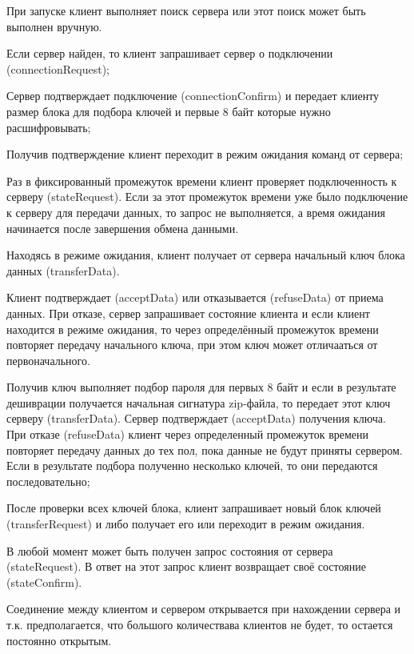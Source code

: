
\begin{DoxyEnumerate}
\item При запуске клиент выполняет поиск сервера или этот поиск может быть выполнен вручную.
\item Если сервер найден, то клиент запрашивает сервер о подключении (connection\+Request);
\item Сервер подтверждает подключение (connection\+Confirm) и передает клиенту размер блока для подбора ключей и первые 8 байт которые нужно расшифровывать;
\item Получив подтверждение клиент переходит в режим ожидания команд от сервера;
\item Раз в фиксированный промежуток времени клиент проверяет подключенность к серверу (state\+Request). Если за этот промежуток времени уже было подключение к серверу для передачи данных, то запрос не выполняется, а время ожидания начинается после завершения обмена данными.
\item Находясь в режиме ожидания, клиент получает от сервера начальный ключ блока данных (transfer\+Data).
\item Клиент подтверждает (accept\+Data) или отказывается (refuse\+Data) от приема данных. При отказе, сервер запрашивает состояние клиента и если клиент находится в режиме ожидания, то через определённый промежуток времени повторяет передачу начального ключа, при этом ключ может отличааться от первоначального.
\item Получив ключ выполняет подбор пароля для первых 8 байт и если в результате дешиврации получается начальная сигнатура zip-\/файла, то передает этот ключ серверу (transfer\+Data). Сервер подтверждает (accept\+Data) получения ключа. При отказе (refuse\+Data) клиент через определенный промежуток времени повторяет передачу данных до тех пол, пока данные не будут приняты сервером. Если в результате подбора полученно несколько ключей, то они передаются последовательно;
\item После проверки всех ключей блока, клиент запрашивает новый блок ключей (transfer\+Request) и либо получает его или переходит в режим ожидания.
\item В любой момент может быть получен запрос состояния от сервера (state\+Request). В ответ на этот запрос клиент возвращает своё состояние (state\+Confirm).
\item Соединение между клиентом и сервером открывается при нахождении сервера и т.\+к. предполагается, что большого количествава клиентов не будет, то остается постоянно открытым. 
\end{DoxyEnumerate}